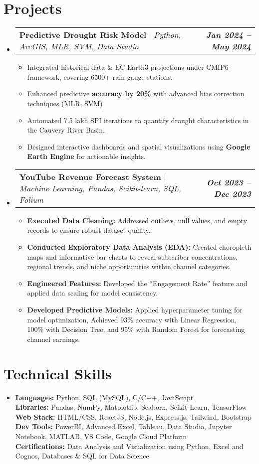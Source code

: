 \documentclass[letterpaper,11pt]{article}
\makeatletter
\newcommand{\resumeProjectHeading}[2]{
    \item
    \begin{tabular*}{0.97\textwidth}{l@{\extracolsep{\fill}}r}
      \small#1 & \textit{\textbf{\small#2}} \\
    \end{tabular*}\vspace{-7pt}
}
\newcommand{\resumeItem}[1]{
  \item\small{
    {#1 \vspace{-2pt}}
  }
}
\newcommand{\resumeSubHeadingListStart}{\begin{itemize}[leftmargin=0.15in, label={}]}
\newcommand{\resumeSubHeadingListEnd}{\end{itemize}}
\newcommand{\resumeItemListStart}{\begin{itemize}}
\newcommand{\resumeItemListEnd}{\end{itemize}\vspace{-5pt}}
\makeatother
\begin{document}
\section{Projects}
    \resumeSubHeadingListStart
      \resumeProjectHeading
          {\textbf{Predictive Drought Risk Model} $|$ \emph{Python, ArcGIS, MLR, SVM, Data Studio}}{Jan 2024 -- May 2024}
          \resumeItemListStart
            \resumeItem{Integrated historical data \& EC-Earth3 projections under CMIP6 framework, covering 6500+ rain gauge stations.}
            \resumeItem{Enhanced predictive \textbf{accuracy by 20\%} with advanced bias correction techniques (MLR, SVM)}
            \resumeItem{Automated 7.5 lakh SPI iterations to quantify drought characteristics in the Cauvery River Basin.}
            \resumeItem{Designed interactive dashboards and spatial visualizations using \textbf{Google Earth Engine} for actionable insights.}
          \resumeItemListEnd
          
      \resumeProjectHeading
          {\textbf{YouTube Revenue Forecast System} $|$ \emph{Machine Learning, Pandas, Scikit-learn, SQL, Folium}}{Oct 2023 -- Dec 2023}
          \resumeItemListStart
            \resumeItem{\textbf{Executed Data Cleaning:} Addressed outliers, null values, and empty records to ensure robust dataset quality.}
            \resumeItem{\textbf{Conducted Exploratory Data Analysis (EDA):} Created choropleth maps and informative bar charts to reveal subscriber concentrations, regional trends, and niche opportunities within channel categories.}
            \resumeItem{\textbf{Engineered Features:} Developed the “Engagement Rate” feature and applied data scaling for model consistency.}
            \resumeItem{\textbf{Developed Predictive Models:} Applied hyperparameter tuning for model optimization, Achieved 93\% accuracy with Linear Regression, 100\% with Decision Tree, and 95\% with Random Forest for forecasting channel earnings.}
          \resumeItemListEnd
    \resumeSubHeadingListEnd


\section{Technical Skills}
 \begin{itemize}[leftmargin=0.15in, label={}]
    \small \item{
         \textbf{Languages:}{ Python, SQL (MySQL), C/C++, JavaScript} \\
         \textbf{Libraries:}{ Pandas, NumPy, Matplotlib, Seaborn, Scikit-Learn, TensorFlow} \\
         \textbf{Web Stack:}{ HTML/CSS, ReactJS, Node.js, Express.js, Tailwind, Bootstrap} \\
         \textbf{Dev Tools:}{ PowerBI, Advanced Excel, Tableau, Data Studio, Jupyter Notebook, MATLAB, VS Code, Google Cloud Platform} \\
         \textbf{Certifications:}{ Data Analysis and Visualization using Python, Excel and Cognos, Databases \& SQL for Data Science}
    } \vspace{-5pt}
 \end{itemize} \vspace{-5pt}
\end{document}
